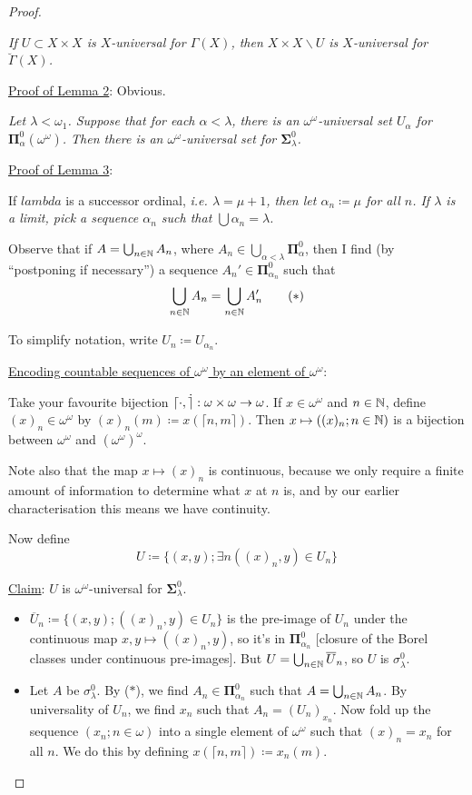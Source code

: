 \documentclass[]{article}
\newcommand{\om}{\omega}
\newcommand{\bosig}{\bm{\Sigma}}
\newcommand{\bopi}{\bm{\Pi}}
\newcommand{\bg}{{\breve \Gamma}}
\begin{document}
\begin{proof}
    \begin{remark*}[Lemma 2]\emph{
        If $U\subset X\times X$ is $X$-universal for $\Gamma(X)$, then $X\times X \backslash U$ is $X$-universal for $\bg(X)$.
    }
    \end{remark*}
    \underline{Proof of Lemma 2}: Obvious.

    \begin{remark*}[Lemma 3]\emph{
        Let $\lambda < \om_1$. Suppose that for each $\alpha < \lambda$, there is an $\om^\om$-universal set $U_\alpha$ for $\bopi_\alpha^0(\om^\om)$. Then there is an $\om^\om$-universal set for $\bosig_\lambda^0$.
    }
    \end{remark*}
    \underline{Proof of Lemma 3}:

    If $lambda$ is a successor ordinal, \it{i.e.} $\lambda = \mu + 1$, then let $\alpha_n \coloneqq \mu$ for all $n$. If $\lambda$ is a limit, pick a sequence $\alpha_n$ such that $\bigcup \alpha_n = \lambda$.

    Observe that if $A = \bigcup_{n\in\mathbb{N}}A_n$, where $A_n \in \bigcup_{\alpha < \lambda}\bopi_\alpha^0$, then I find (by ``postponing if necessary'') a sequence $A_n'\in \bopi_{\alpha_n}^0$ such that $$\bigcup_{n\in\mathbb{N}}A_n = \bigcup_{n\in\mathbb{N}}A_n'\qquad (\ast)$$

    To simplify notation, write $U_n \coloneqq U_{\alpha_n}$.

    \underline{Encoding countable sequences of $\om^\om$ by an element of $\om^\om$}:

    Take your favourite bijection $\lceil \cdot , \dot \rceil:\om\times \om \ra \om$. If $x \in \om^\om$ and $n \in \mathbb{N}$, define $(x)_n \in \om^\om$ by $(x)_n(m) \coloneqq x(\lceil n,m\rceil)$. Then $x\mapsto ((x)_n;n\in\mathbb{N})$ is a bijection between $\om^\om$ and $(\om^\om)^\om$.
    
    Note also that the map $x\mapsto (x)_n$ is continuous, because we only require a finite amount of information to determine what $x$ at $n$ is, and by our earlier characterisation this means we have continuity.

    Now define $$U\coloneqq \{(x,y);\exists n((x)_n,y)\in U_n\}$$

    \underline{Claim}: $U$ is $\om^\om$-universal for $\bosig_\lambda^0$.
    \begin{itemize}
        \item $\overline{U}_n\coloneqq \{(x,y);((x)_n,y)\in U_n\}$ is the pre-image of $U_n$ under the continuous map $x,y\mapsto ((x)_n,y)$, so it's in $\bopi_{\alpha_n}^0$ [closure of the Borel classes under continuous pre-images]. But $U = \bigcup_{n\in\mathbb{N}}\overline{U}_n$, so $U$ is $\sigma_{\lambda}^0$.
        \item Let $A$ be $\sigma_\lambda^0$. By ($\ast$), we find $A_n \in \bopi_{\alpha_n}^0$ such that $A = \bigcup_{n\in\mathbb{N}}A_n$. By universality of $U_n$, we find $x_n$ such that $A_n = (U_n)_{x_n}$. Now fold up the sequence $(x_n;n\in \om)$ into a single element of $\om^\om$ such that $(x)_n = x_n$ for all $n$. We do this by defining $x(\lceil n,m\rceil)\coloneqq x_n(m)$.
        

\end{itemize}
\end{proof}
\end{document}
